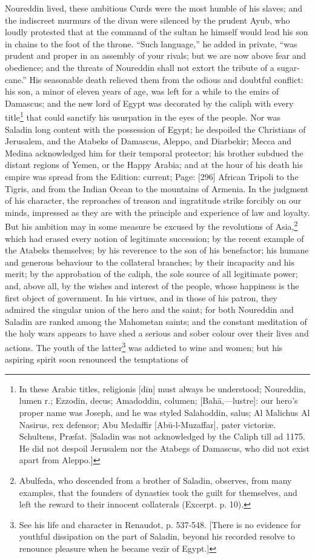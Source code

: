 Noureddin lived, these ambitious Curds were the most humble of his slaves; and the indiscreet murmurs of the divan were silenced by the prudent Ayub, who loudly protested that at the command of the sultan he himself would lead his son in chains to the foot of the throne. \texthebrew{“}Such language,\texthebrew{}” he added in private, \texthebrew{“}was prudent and proper in an assembly of your rivals; but we are now above fear and obedience; and the threats of Noureddin shall not extort the tribute of a sugar-cane.\texthebrew{}” His seasonable death relieved them from the odious and doubtful conflict: his son, a minor of eleven years of age, was left for a while to the emirs of Damascus; and the new lord of Egypt was decorated by the caliph with every title\footnote{In these Arabic titles, religionis [dīn] must always be understood; Noureddin, lumen r.; Ezzodin, decus; Amadoddin, columen; [Bahā,\texthebrew{—}lustre]: our hero\texthebrew{}’s proper name was Joseph, and he was styled Salahoddin, salus; Al Malichus Al Nasirus, rex defensor; Abu Medaffir [Abū-l-Muzaffar], pater victoriæ. Schultens, Præfat. [Saladin was not acknowledged by the Caliph till ad 1175. He did not despoil Jerusalem nor the Atabegs of Damascus, who did not exist apart from Aleppo.]} that could sanctify his usurpation in the eyes of the people. Nor was Saladin long content with the possession of Egypt; he despoiled the Christians of Jerusalem, and the Atabeks of Damascus, Aleppo, and Diarbekir; Mecca and Medina acknowledged him for their temporal protector; his brother subdued the distant regions of Yemen, or the Happy Arabia; and at the hour of his death his empire was spread from the Edition: current; Page: [296] African Tripoli to the Tigris, and from the Indian Ocean to the mountains of Armenia. In the judgment of his character, the reproaches of treason and ingratitude strike forcibly on our minds, impressed as they are with the principle and experience of law and loyalty. But his ambition may in some measure be excused by the revolutions of Asia,\footnote{Abulfeda, who descended from a brother of Saladin, observes, from many examples, that the founders of dynasties took the guilt for themselves, and left the reward to their innocent collaterals (Excerpt. p. 10).} which had erased every notion of legitimate succession; by the recent example of the Atabeks themselves; by his reverence to the son of his benefactor; his humane and generous behaviour to the collateral branches; by their incapacity and his merit; by the approbation of the caliph, the sole source of all legitimate power; and, above all, by the wishes and interest of the people, whose happiness is the first object of government. In his virtues, and in those of his patron, they admired the singular union of the hero and the saint; for both Noureddin and Saladin are ranked among the Mahometan saints; and the constant meditation of the holy wars appears to have shed a serious and sober colour over their lives and actions. The youth of the latter\footnote{See his life and character in Renaudot, p. 537-548. [There is no evidence for youthful dissipation on the part of Saladin, beyond his recorded resolve to renounce pleasure when he became vezīr of Egypt.]} was addicted to wine and women; but his aspiring spirit soon renounced the temptations of 